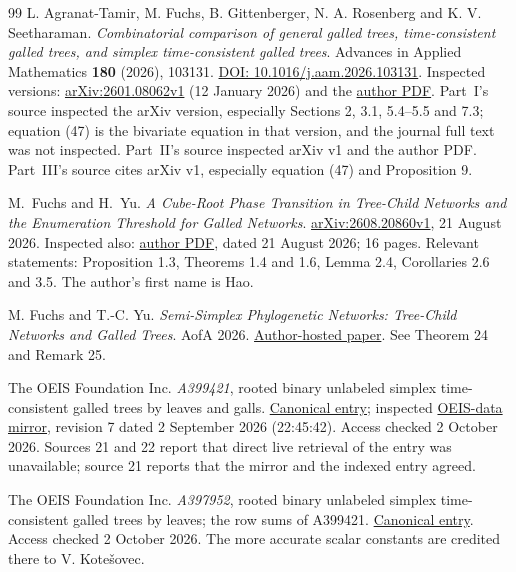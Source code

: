 \documentclass[11pt,letterpaper]{article}
\numberwithin{equation}{section}
\theoremstyle{definition}\newtheorem{definition}[theorem]{Definition}
\theoremstyle{remark}\newtheorem{remark}[theorem]{Remark}
\begin{document}
\begin{thebibliography}{99}
L. Agranat-Tamir, M. Fuchs, B. Gittenberger, N. A. Rosenberg and K. V. Seetharaman.
\emph{Combinatorial comparison of general galled trees, time-consistent galled trees, and simplex time-consistent galled trees}.
Advances in Applied Mathematics \textbf{180} (2026), 103131.
\href{https://doi.org/10.1016/j.aam.2026.103131}{DOI: 10.1016/j.aam.2026.103131}.
Inspected versions: \href{https://arxiv.org/html/2601.08062v1}{arXiv:2601.08062v1} (12 January 2026) and the
\href{https://web.math.nccu.edu.tw/mfuchs/gen-galled-trees-sub.pdf}{author PDF}. Part~I's source inspected the arXiv version, especially Sections 2, 3.1, 5.4--5.5 and 7.3; equation (47) is the bivariate equation in that version, and the journal full text was not inspected. Part~II's source inspected arXiv v1 and the author PDF. Part~III's source cites arXiv v1, especially equation (47) and Proposition 9.

M.~Fuchs and H.~Yu.
\emph{A Cube-Root Phase Transition in Tree-Child Networks and the Enumeration Threshold for Galled Networks}.
\href{https://arxiv.org/html/2608.20860v1}{arXiv:2608.20860v1}, 21 August 2026.
Inspected also: \href{https://web.math.nccu.edu.tw/mfuchs/pt-and-enum-sub.pdf}{author PDF}, dated 21 August 2026; 16 pages. Relevant statements: Proposition 1.3, Theorems 1.4 and 1.6, Lemma 2.4, Corollaries 2.6 and 3.5. The author's first name is Hao.

M. Fuchs and T.-C. Yu.
\emph{Semi-Simplex Phylogenetic Networks: Tree-Child Networks and Galled Trees}.
AofA 2026.
\href{https://web.math.nccu.edu.tw/mfuchs/SSTC-AofA2026.pdf}{Author-hosted paper}. See Theorem 24 and Remark 25.

The OEIS Foundation Inc. \emph{A399421}, rooted binary unlabeled simplex time-consistent galled trees by leaves and galls.
\href{https://oeis.org/A399421}{Canonical entry}; inspected
\href{https://raw.githubusercontent.com/oeis/oeisdata/main/seq/A399/A399421.seq}{OEIS-data mirror}, revision 7 dated 2 September 2026 (22:45:42). Access checked 2 October 2026. Sources 21 and 22 report that direct live retrieval of the entry was unavailable; source 21 reports that the mirror and the indexed entry agreed.

The OEIS Foundation Inc. \emph{A397952}, rooted binary unlabeled simplex time-consistent galled trees by leaves; the row sums of A399421.
\href{https://oeis.org/A397952}{Canonical entry}. Access checked 2 October 2026. The more accurate scalar constants are credited there to V. Kote\v{s}ovec.


\end{thebibliography}
\end{document}
